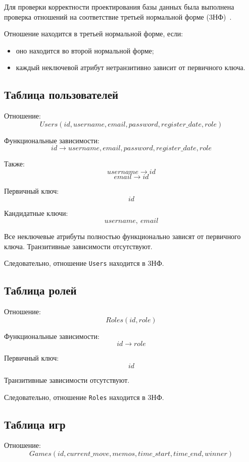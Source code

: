 Для проверки корректности проектирования базы данных была выполнена
проверка отношений на соответствие третьей нормальной форме (3НФ)~\cite{date}.

Отношение находится в третьей нормальной форме, если:
\begin{itemize}
	\item оно находится во второй нормальной форме;
	\item каждый неключевой атрибут нетранзитивно зависит от первичного
	      ключа.
\end{itemize}

\subsection{Таблица пользователей}

Отношение:
\[
	Users(
	id,
	username,
	email,
	password,
	register\_date,
	role
	)
\]

Функциональные зависимости:
\[
	id \rightarrow username,
	email,
	password,
	register\_date,
	role
\]

Также:
\[
	username \rightarrow id
\]
\[
	email \rightarrow id
\]

Первичный ключ:
\[
	id
\]

Кандидатные ключи:
\[
	username,\ email
\]

Все неключевые атрибуты полностью функционально зависят от первичного ключа.
Транзитивные зависимости отсутствуют.

Следовательно, отношение \texttt{Users} находится в 3НФ.

\subsection{Таблица ролей}

Отношение:
\[
	Roles(
	id,
	role
	)
\]

Функциональные зависимости:
\[
	id \rightarrow role
\]

Первичный ключ:
\[
	id
\]

Транзитивные зависимости отсутствуют.

Следовательно, отношение \texttt{Roles} находится в 3НФ.

\subsection{Таблица игр}

Отношение:
\[
	Games(
	id,
	current\_move,
	memos,
	time\_start,
	time\_end,
	winner
	)
\]

